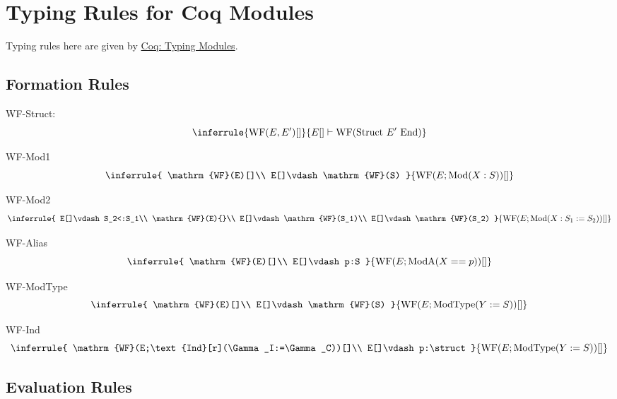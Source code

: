 \chapter{Typing Rules for Coq Modules}

\newcommand{\wf}[1]{\mathrm{WF}(#1)}
\newcommand{\struct}[1]{\text{Struct }#1\text{ End}}
\newcommand{\module}[1]{\text{Mod}(#1)}
\newcommand{\moda}[1]{\text{ModA}(#1)}
\newcommand{\modtype}[1]{\text{ModType}(#1)}
\newcommand{\with}{\text{ with }}
\newcommand{\range} %
[3]{{#1}_{#2};\ldots;{#1}_{#3}}

Typing rules here are given by
\href{https://coq.inria.fr/refman/language/core/modules.html#typing-modules}{Coq: Typing Modules}.

\section{Formation Rules}
WF-Struct:
\[
\inferrule{\wf{E,E'}[]}{E[]\vdash\wf{\struct{E'}}}
\]

WF-Mod1
\[
\inferrule{
    \wf{E}[]\\ E[]\vdash\wf{S}
}{
    \wf{E;\module{X:S}}[]
}    
\]

WF-Mod2
\[
\inferrule{
    E[]\vdash S_2<:S_1\\
    \wf{E}{}\\
    E[]\vdash\wf{S_1}\\
    E[]\vdash\wf{S_2}
}{
    \wf{E;\module{X:S_1:=S_2}}[]
}    
\]

WF-Alias
\[
\inferrule{
    \wf{E}[]\\
    E[]\vdash p:S
}{
    \wf{E;\moda{X==p}}[]
}    
\]

WF-ModType
\[
\inferrule{
    \wf{E}[]\\
    E[]\vdash\wf{S}
}{
    \wf{E;\modtype{Y:=S}}[]
}    
\]

WF-Ind
\[
\inferrule{
    \wf{E;\text{Ind}[r](\Gamma_I:=\Gamma_C)}[]\\
    E[]\vdash p:\struct
}{
    \wf{E;\modtype{Y:=S}}[]
}    
\]

\section{Evaluation Rules}
